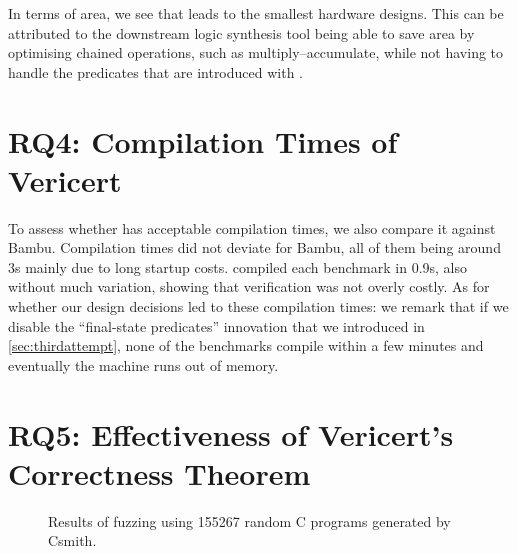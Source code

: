 In terms of area, we see that \VericertList{} leads to the smallest hardware
designs. This can be attributed to the downstream logic synthesis tool being
able to save area by optimising chained operations, such as
multiply--accumulate, while not having to handle the predicates that are
introduced with \VericertHyper{}.

\section{RQ4: Compilation Times of Vericert}

To assess whether \VericertHyper{} has acceptable compilation times, we also
compare it against Bambu.  Compilation times did not deviate for Bambu, all of
them being around 3s mainly due to long startup costs. \VericertHyper{} compiled
each benchmark in 0.9s, also without much variation, showing that verification
was not overly costly.  As for whether our design decisions led to these
compilation times: we remark that if we disable the \enquote{final-state
  predicates} innovation that we introduced in \cref{sec:thirdattempt}, none of
the benchmarks compile within a few minutes and eventually the machine runs out
of memory.

\section{RQ5: Effectiveness of Vericert's Correctness Theorem}

\begin{figure}
  \centering

  \caption{Results of fuzzing \vericert{} using 155267 random C programs generated by Csmith.}\label{tab:fuzzing}
\end{figure}

